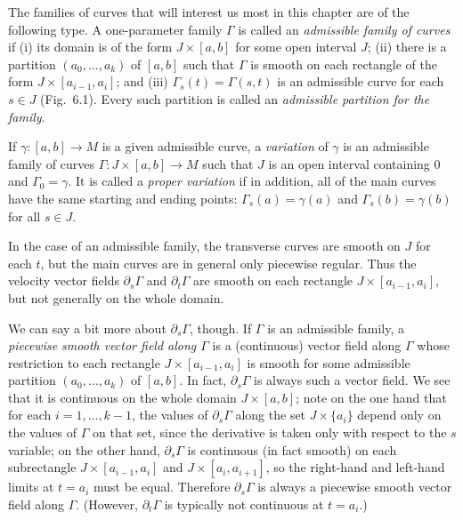 The families of curves that will interest us most in this chapter are of the following type. A one-parameter family $\Gamma$ is called an \emph{admissible family of curves} if (i) its domain is of the form $J \times [a,b]$ for some open interval $J$; (ii) there is a partition $(a_0, \ldots, a_k)$ of $[a,b]$ such that $\Gamma$ is smooth on each rectangle of the form $J \times [a_{i-1}, a_i]$; and (iii) $\Gamma_s(t) = \Gamma(s,t)$ is an admissible curve for each $s \in J$ (Fig.~6.1). Every such partition is called an \emph{admissible partition for the family}.

\begin{definition}[Variations]
\label{def:variations-proper-variations}

If $\gamma: [a,b] \to M$ is a given admissible curve, a \emph{variation} of $\gamma$ is an admissible family of curves $\Gamma: J \times [a,b] \to M$ such that $J$ is an open interval containing $0$ and $\Gamma_0 = \gamma$. It is called a \emph{proper variation} if in addition, all of the main curves have the same starting and ending points: $\Gamma_s(a) = \gamma(a)$ and $\Gamma_s(b) = \gamma(b)$ for all $s \in J$.
\end{definition}

In the case of an admissible family, the transverse curves are smooth on $J$ for each $t$, but the main curves are in general only piecewise regular. Thus the velocity vector fields $\partial_s \Gamma$ and $\partial_t \Gamma$ are smooth on each rectangle $J \times [a_{i-1}, a_i]$, but not generally on the whole domain.

We can say a bit more about $\partial_s\Gamma$, though. If $\Gamma$ is an admissible family, a \emph{piecewise smooth vector field along $\Gamma$} is a (continuous) vector field along $\Gamma$ whose restriction to each rectangle $J \times [a_{i-1}, a_i]$ is smooth for some admissible partition $(a_0, \ldots, a_k)$ of $[a,b]$. In fact, $\partial_s\Gamma$ is always such a vector field. We see that it is continuous on the whole domain $J \times [a,b]$; note on the one hand that for each $i = 1, \ldots, k-1$, the values of $\partial_s\Gamma$ along the set $J \times \{a_i\}$ depend only on the values of $\Gamma$ on that set, since the derivative is taken only with respect to the $s$ variable; on the other hand, $\partial_s\Gamma$ is continuous (in fact smooth) on each subrectangle $J \times [a_{i-1}, a_i]$ and $J \times [a_i, a_{i+1}]$, so the right-hand and left-hand limits at $t = a_i$ must be equal. Therefore $\partial_s\Gamma$ is always a piecewise smooth vector field along $\Gamma$. (However, $\partial_t\Gamma$ is typically not continuous at $t = a_i$.)

